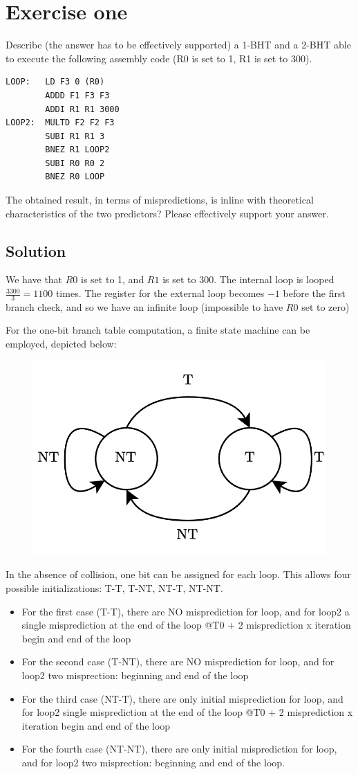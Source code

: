 \section{Exercise one}

Describe (the answer has to be effectively supported) a 1-BHT and a 2-BHT able to execute the following assembly code (R0 is set to 1, R1 is set to 300). 
\begin{verbatim}
LOOP:   LD F3 0 (R0)
        ADDD F1 F3 F3
        ADDI R1 R1 3000
LOOP2:  MULTD F2 F2 F3
        SUBI R1 R1 3
        BNEZ R1 LOOP2
        SUBI R0 R0 2
        BNEZ R0 LOOP
\end{verbatim}
The obtained result, in terms of mispredictions, is inline with theoretical characteristics of the two predictors? 
Please effectively support your answer.

\subsection*{Solution}
We have that $R0$ is set to 1, and $R1$ is set to 300. 
The internal loop is looped $\frac{3300}{3}=1100$ times. 
The register for the external loop becomes $-1$ before the first branch check, and so we have an infinite loop (impossible to have $R0$ set to zero)

For the one-bit branch table computation, a finite state machine can be employed, depicted below:
\begin{figure}[H]
    \centering
    \includegraphics[width=0.4\linewidth]{images/1bht.png}
\end{figure}

In the absence of collision, one bit can be assigned for each loop. 
This allows four possible initializations: T-T, T-NT, NT-T, NT-NT.
\begin{itemize}
    \item For the first case (T-T), there are NO misprediction for loop, and for loop2 a single misprediction at the end of the loop @T0 + 2 misprediction x iteration begin and end of the loop
    \item For the second case (T-NT), there are NO misprediction for loop, and for loop2 two misprection: beginning and end of the loop
    \item For the third case (NT-T), there are only initial misprediction for loop, and for loop2 single misprediction at the end of the loop @T0 + 2 misprediction x iteration begin and end of the loop
    \item For the fourth case (NT-NT), there are only initial misprediction for loop, and for loop2 two misprection: beginning and end of the loop. 
\end{itemize}

